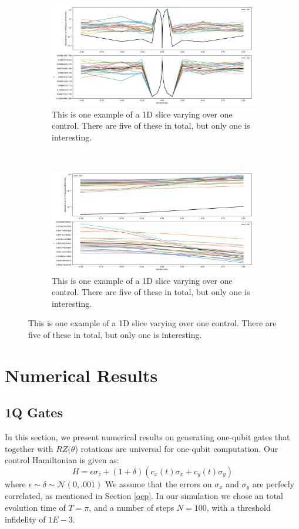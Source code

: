 \documentclass[aps,nofootinbib,pra,notitlepage,twocolumn]{revtex4-1}
\begin{document}
\begin{figure}
\centering
\begin{subfigure}[t]{.5\linewidth}
\includegraphics[width=\textwidth]{control_dpn_all0.png}
\caption{This is one example of a 1D slice varying over one control. There are five of these in total, but only one is interesting.}
\end{subfigure}%
~
\begin{subfigure}[t]{.5\linewidth}
\includegraphics[width=\textwidth]{control_dpn_all2.png}
\caption{This is one example of a 1D slice varying over one control. There are five of these in total, but only one is interesting.}
\end{subfigure}
  \label{fig:2qnum}
\end{figure}
\section{Numerical Results}\label{numerical}
\subsection{1Q Gates}\label{1Q Gates}
 In this section, we present numerical results on generating one-qubit gates that together with $RZ(\theta$) rotations are universal for one-qubit computation. Our control Hamiltonian is given as: 
\begin{equation}\label{eq:1Qham}
  H = \epsilon\sigma_z + (1 + \delta)(c_x(t)\sigma_x + c_y(t)\sigma_y)
\end{equation}
where $\epsilon \sim \delta \sim \mathcal{N}(0, .001)$ We assume that the errors on $\sigma_x$ and $\sigma_y$ are perfecly correlated, as mentioned in Section \ref{ocp}. In our simulation we chose an total evolution time of $T=\pi$, and a number of steps $N=100$, with a threshold infidelity of $1E-3$.  
\end{document}
